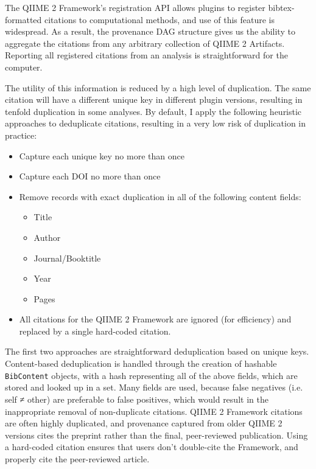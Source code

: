 The QIIME 2 Framework’s registration API allows plugins to register
bibtex-formatted citations to computational methods, and use of this feature is
widespread. As a result, the provenance DAG structure gives us the ability to
aggregate the citations from any arbitrary collection of QIIME 2 Artifacts.
Reporting all registered citations from an analysis is straightforward for the
computer.

The utility of this information is reduced by a high level of duplication. The
same citation will have a different unique key in different plugin versions,
resulting in tenfold duplication in some analyses. By default, I apply the
following heuristic approaches to deduplicate citations, resulting in a very low
risk of duplication in practice:

\begin{itemize}
\item Capture each unique key no more than once
\item Capture each DOI no more than once
\item Remove records with exact duplication in all of the following content fields:
    \begin{itemize}
    \item Title
    \item Author
    \item Journal/Booktitle
    \item Year
    \item Pages
    \end{itemize}
\item All citations for the QIIME 2 Framework are ignored (for efficiency) and
    replaced by a single hard-coded citation.
\end{itemize}

The first two approaches are straightforward deduplication based on unique keys.
Content-based deduplication is handled through the creation of hashable
\texttt{BibContent} objects, with a hash representing all of the above fields, which are
stored and looked up in a set. Many fields are used, because false negatives
(i.e. self ≠ other) are preferable to false positives, which would result in
the inappropriate removal of non-duplicate citations.  QIIME 2 Framework
citations are often highly duplicated, and provenance captured from older
QIIME 2 versions cites the preprint rather than the final, peer-reviewed
publication. Using a hard-coded citation ensures that users don’t double-cite
the Framework, and properly cite the peer-reviewed article.

